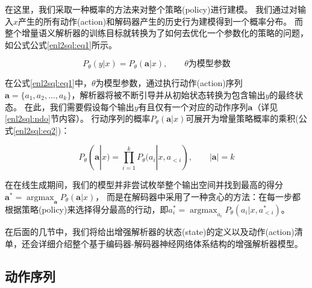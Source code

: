 在这里，我们采取一种概率的方法来对整个策略(policy)进行建模。
我们通过对输入$x$产生的所有动作(action)和解码器产生的历史行为建模得到一个概率分布。
而整个增量语义解析器的训练目标就转换为了如何去优化一个参数化的策略的问题，如公式公式\ref{enl2sql:eq1}所示。

\begin{equation}
    \label{enl2sql:eq1}
    P_{\theta}(y|x) = P_{\theta}(\boldsymbol{a}|x),  \qquad \theta\text{为模型参数}
\end{equation}

在公式\ref{enl2sql:eq1}中，$\theta$为模型参数，通过执行动作(action)序列$\boldsymbol{a} = \{a_{1},a_{2},...,a_{k}\}$，解析器将被不断引导并从初始状态转换为包含输出$y$的最终状态。
在此，我们需要假设每个输出$y$有且仅有一个对应的动作序列$\boldsymbol{a}$（详见\ref{enl2sql:ndo}节内容）。
行动序列的概率$P_{\theta}(\boldsymbol{a}|x)$可展开为增量策略概率的乘积(公式\ref{enl2sql:eq2})：

\begin{equation}
    \label{enl2sql:eq2}
    P_{\theta}(\boldsymbol{a}|x) = \prod^k_{i=1}P_{\theta}(a_{i}|x,a_{<i}),   \qquad |\boldsymbol{a}| = k
\end{equation}

在在线生成期间，我们的模型并非尝试枚举整个输出空间并找到最高的得分$\boldsymbol{a}^{*} = \mathop{\arg\max}_{\boldsymbol{a}} P_{\theta}(\boldsymbol{a}|x)$，
而是在解码器中采用了一种贪心的方法：在每一步都根据策略(policy)来选择得分最高的行动，即$a^{*}_{i} = \mathop{\arg\max}_{a_{i}} P_{\theta}(a_{i}|x,a^{*}_{<i})$。

在后面的几节中，我们将给出增强解析器的状态(state)的定义以及动作(action)清单，还会详细介绍整个基于编码器-解码器神经网络体系结构的增强解析器模型。


\subsection{动作序列}
\label{enl2sql:dzxl}

